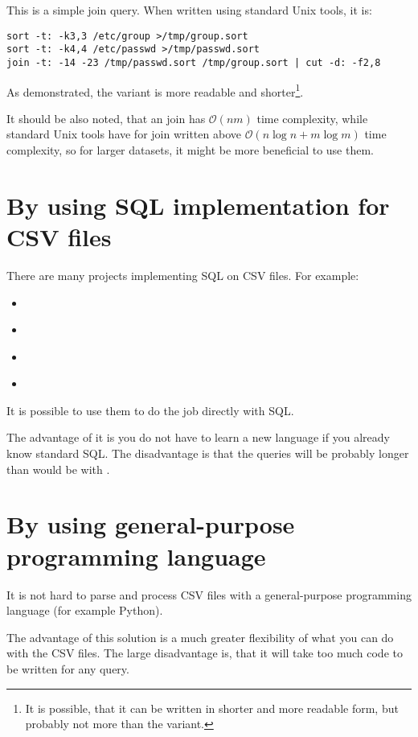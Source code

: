 This is a simple join query. When written using standard Unix tools, it is:
\begin{verbatim}
sort -t: -k3,3 /etc/group >/tmp/group.sort
sort -t: -k4,4 /etc/passwd >/tmp/passwd.sort
join -t: -14 -23 /tmp/passwd.sort /tmp/group.sort | cut -d: -f2,8 
\end{verbatim}

As demonstrated, the  variant is 
more readable and shorter\footnote{It is possible, that it can be written in shorter and more readable form, but probably not more than the  variant.}.

It should be also noted, that an  join has $\mathcal{O}(nm)$ time complexity, while standard Unix tools have for join written above
$\mathcal{O}(n\log n + m\log m)$ time complexity, so for larger datasets, it might be more beneficial to use them.

\section{By using SQL implementation for CSV files}
There are many projects implementing SQL on CSV files. For example:
\begin{itemize}
    \item {} \cite{q}
    \item {} \cite{csv-sql} 
    \item {} \cite{trdsql}
    \item {} \cite{csvq}
\end{itemize}

It is possible to use them to do the job directly with SQL. 

The advantage of it is you do not have to learn a new language if you already know standard SQL. 
The disadvantage is that the queries will be probably longer than would be with .

\section{By using general-purpose programming language}
It is not hard to parse and process CSV files with a general-purpose programming language (for example Python).

The advantage of this solution is a much greater flexibility of what you can do with the CSV files.
The large disadvantage is, that it will take too much code to be written for any query.

